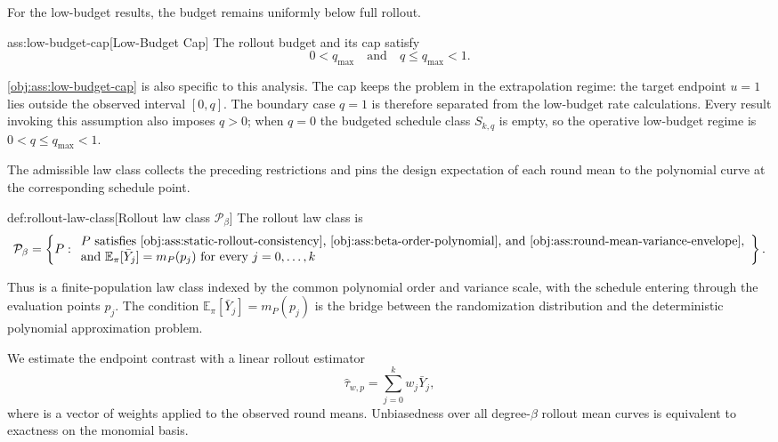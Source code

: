For the low-budget results, the budget remains uniformly below full rollout.

\begin{assumptionv}{ass:low-budget-cap}[Low-Budget Cap]
The rollout budget and its cap satisfy
\[
0<q_{\max}\quad\text{and}\quad q\le q_{\max}<1.
\]
\end{assumptionv}

\cref{obj:ass:low-budget-cap} is also specific to this analysis. The cap  keeps the problem in the extrapolation regime: the target endpoint \(u=1\) lies outside the observed interval \([0,q]\). The boundary case \(q=1\) is therefore separated from the low-budget rate calculations. Every result invoking this assumption also imposes \(q>0\); when \(q=0\) the budgeted schedule class \(S_{k,q}\) is empty, so the operative low-budget regime is \(0<q\le q_{\max}<1\).

The admissible law class collects the preceding restrictions and pins the design expectation of each round mean to the polynomial curve at the corresponding schedule point.

\begin{definitionv}{def:rollout-law-class}[Rollout law class \(\mathcal P_\beta\)]
The rollout law class is
\[
\mathcal P_\beta
=
\left\{
P:
\begin{array}{l}
P \text{ satisfies \cref{obj:ass:static-rollout-consistency}, \cref{obj:ass:beta-order-polynomial}, and \cref{obj:ass:round-mean-variance-envelope}},\\
\text{and } \mathbb E_\pi[\bar Y_j]=m_P(p_j) \text{ for every } j=0,\ldots,k
\end{array}
\right\}.
\]
\end{definitionv}

Thus  is a finite-population law class indexed by the common polynomial order and variance scale, with the schedule entering through the evaluation points \(p_j\). The condition \(\mathbb E_\pi[\bar Y_j]=m_P(p_j)\) is the bridge between the randomization distribution and the deterministic polynomial approximation problem.

We estimate the endpoint contrast with a linear rollout estimator
\[
\hat\tau_{w,p}=\sum_{j=0}^k w_j\bar Y_j,
\]
where  is a vector of weights applied to the observed round means. Unbiasedness over all degree-\(\beta\) rollout mean curves is equivalent to exactness on the monomial basis.

